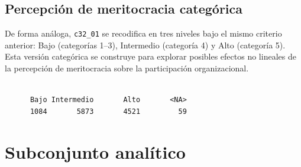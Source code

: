 \documentclass[
  spanish,
  a4paper,
  oneside]{scrbook}
\newenvironment{Shaded}{\begin{snugshade}}{\end{snugshade}}
\newcommand{\AttributeTok}[1]{\textcolor[rgb]{0.40,0.45,0.13}{#1}}
\newcommand{\ConstantTok}[1]{\textcolor[rgb]{0.56,0.35,0.01}{#1}}
\newcommand{\DecValTok}[1]{\textcolor[rgb]{0.68,0.00,0.00}{#1}}
\newcommand{\FunctionTok}[1]{\textcolor[rgb]{0.28,0.35,0.67}{#1}}
\newcommand{\NormalTok}[1]{\textcolor[rgb]{0.00,0.23,0.31}{#1}}
\newcommand{\OtherTok}[1]{\textcolor[rgb]{0.00,0.23,0.31}{#1}}
\newcommand{\SpecialCharTok}[1]{\textcolor[rgb]{0.37,0.37,0.37}{#1}}
\newcommand{\StringTok}[1]{\textcolor[rgb]{0.13,0.47,0.30}{#1}}
\begin{document}
\section{Percepción de meritocracia
categórica}\label{percepciuxf3n-de-meritocracia-categuxf3rica}

De forma análoga, \texttt{c32\_01} se recodifica en tres niveles bajo el
mismo criterio anterior: Bajo (categorías 1--3), Intermedio (categoría
4) y Alto (categoría 5). Esta versión categórica se construye para
explorar posibles efectos no lineales de la percepción de meritocracia
sobre la participación organizacional.

\begin{Shaded}
\end{Shaded}

\begin{verbatim}

      Bajo Intermedio       Alto       <NA> 
      1084       5873       4521         59 
\end{verbatim}

\chapter{Subconjunto analítico}\label{subconjunto-analuxedtico}
\end{document}
